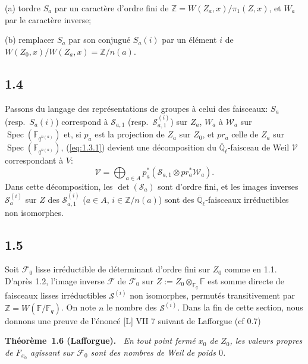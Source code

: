 \documentclass[10pt,a4paper]{article}
\makeatletter
\theoremstyle{plain}
\theoremstyle{definition}
\newenvironment{manualblock}[4]{%
  \par\medskip\noindent\textbf{#1~#2#3.}\def\@currentlabel{#2}\label{#4}\itshape\ }{\par\normalfont\medskip}
\DeclareMathOperator{\Spec}{Spec}
\makeatother
\begin{document}
(a) tordre $S_a$ par un caract\`ere d'ordre fini de $\mathbb{Z} = W(Z_a,x)/\pi_1(Z,x)$, et $W_a$ par le caract\`ere inverse;

(b) remplacer $S_a$ par son conjugu\'e $S_a(i)$ par un \'el\'ement $i$ de $W(Z_0,x)/W(Z_a,x) = \mathbb{Z}/n(a)$.

\subsection*{1.4}

Passons du langage des repr\'esentations de groupes \`a celui des faisceaux: $S_a$ (resp.~$S_a(i)$) correspond \`a $\mathcal{S}_{a,1}$ (resp.~$\mathcal{S}_{a,1}^{(i)}$) sur $Z_a$, $W_a$ \`a $\mathcal{W}_a$ sur $\Spec(\mathbb{F}_{q^{n(a)}})$ et, si $p_a$ est la projection de $Z_a$ sur $Z_0$, et $pr_a$ celle de $Z_a$ sur $\Spec(\mathbb{F}_{q^{n(a)}})$, (\ref{eq:1.3.1}) devient une d\'ecomposition du $\overline{\mathbb{Q}}_\ell$-faisceau de Weil $\mathcal{V}$ correspondant \`a $V$:
\begin{equation}\label{eq:1.4.1}
\mathcal{V} = \bigoplus_{a \in A} p_a^*(\mathcal{S}_{a,1} \otimes pr_a^* \mathcal{W}_a).
\end{equation}
Dans cette d\'ecomposition, les $\det(\mathcal{S}_a)$ sont d'ordre fini, et les images inverses $\mathcal{S}_a^{(i)}$ sur $Z$ des $\mathcal{S}_{a,1}^{(i)}$ ($a \in A$, $i \in \mathbb{Z}/n(a)$) sont des $\overline{\mathbb{Q}}_\ell$-faisceaux irr\'eductibles non isomorphes.

\subsection*{1.5}

Soit $\mathcal{F}_0$ lisse irr\'eductible de d\'eterminant d'ordre fini sur $Z_0$ comme en 1.1. D'apr\`es 1.2, l'image inverse $\mathcal{F}$ de $\mathcal{F}_0$ sur $Z := Z_0 \otimes_{\mathbb{F}_q} \mathbb{F}$ est somme directe de faisceaux lisses irr\'eductibles $\mathcal{S}^{(i)}$ non isomorphes, permut\'es transitivement par $\mathbb{Z} = W(\mathbb{F}/\mathbb{F}_q)$. On note $n$ le nombre des $\mathcal{S}^{(i)}$. Dans la fin de cette section, nous donnons une preuve de l'\'enonc\'e [L] VII 7 suivant de Lafforgue (cf 0.7)

\begin{manualblock}{Théorème}{1.6}{ (Lafforgue)}{thm:1.6}
En tout point ferm\'e $x_0$ de $Z_0$, les valeurs propres de $F_{x_0}$ agissant sur $\mathcal{F}_0$ sont des nombres de Weil de poids $0$.
\end{manualblock}
\end{document}
